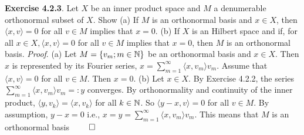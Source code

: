 {\bf Exercise 4.2.3}. Let $X$ be an inner product space and $M$ a denumerable orthonormal subset of $X$. Show (a) If $M$ is an orthonormal basis and $x \in X$, then $\langle x,v \rangle = 0$ for all $v \in M$ implies that $x = 0$. (b) If $X$ is an Hilbert space and if, for all $x \in X, \langle x,v \rangle = 0$ for all $v \in M$ implies that $x = 0$, then $M$ is an orthonormal basis. {\it Proof}. (a) Let $M=\{v_m; m \in \mathbb{N}\}$ be an orthonormal basis and $x \in X$. Then $x$ is represented by its Fourier series, $x = \sum_{m=1}^{\infty}\langle x, v_m\rangle v_m$. Assume that $\langle x,v \rangle = 0$ for all $v \in M$. Then $x =0$. (b) Let $x \in X$. By Exercise 4.2.2, the series $\sum_{m=1}^{\infty}\langle x, v_m \rangle v_m =: y$ converges. By orthonormality and continuity of the inner product, $\langle y, v_k\rangle = \langle x, v_k \rangle$ for all $k\in \mathbb{N}$. So $\langle y-x, v \rangle = 0$ for all $v \in M$. By assumption, $y-x = 0$ i.e., $x = y = \sum_{m=1}^{\infty}\langle x, v_m \rangle v_m$. This means that $M$ is an orthonormal basis $\qed$  